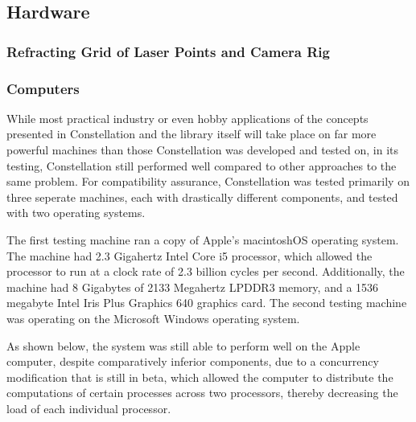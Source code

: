\subsection{Hardware}
\subsubsection{Refracting Grid of Laser Points and Camera Rig}
\subsubsection{Computers}
While most practical industry or even hobby applications of the concepts presented in Constellation and the library itself will take place on far more powerful machines than those Constellation was developed and tested on, in its testing, Constellation still performed well compared to other approaches to the same problem. For compatibility assurance, Constellation was tested primarily on three seperate machines, each with drastically different components, and tested with two operating systems.

The first testing machine ran a copy of Apple's macintoshOS operating system. The machine had 2.3 Gigahertz Intel Core i5 processor, which allowed the processor to run at a clock rate of 2.3 billion cycles per second. Additionally, the machine had 8 Gigabytes of 2133 Megahertz LPDDR3 memory, and a 1536 megabyte Intel Iris Plus Graphics 640 graphics card. The second testing machine was operating on the Microsoft Windows operating system.

As shown below, the system was still able to perform well on the Apple computer, despite comparatively inferior components, due to a concurrency modification that is still in beta, which allowed the computer to distribute the computations of certain processes across two processors, thereby decreasing the load of each individual processor.